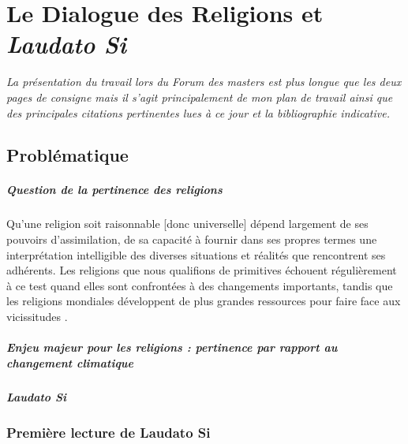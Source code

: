 \chapter{Le Dialogue des Religions et \textit{Laudato Si}}

\textit{La présentation du travail lors du Forum des masters est plus longue que les deux pages de consigne mais il s'agit principalement de mon plan de travail ainsi que des principales citations pertinentes lues à ce jour et la bibliographie indicative. 
}
\section{Problématique} 
\paragraph{Question de la pertinence des religions}
\begin{singlequote}
        Qu’une religion soit raisonnable [donc universelle] dépend largement de ses
pouvoirs d’assimilation, de sa capacité à fournir dans ses propres termes une
interprétation intelligible des diverses situations et réalités que rencontrent
ses adhérents. Les religions que nous qualifions de primitives échouent régulièrement
à ce test quand elles sont confrontées à des changements importants,
tandis que les religions mondiales développent de plus grandes ressources pour
faire face aux vicissitudes \cite[ p. 175]{lindbeck_nature_2002}.
\end{singlequote}

\paragraph{Enjeu majeur pour les religions : pertinence par rapport au changement climatique}

\paragraph{Laudato Si}  \cite{francois_laudato_2015}

\subsection{Première lecture de Laudato Si }

